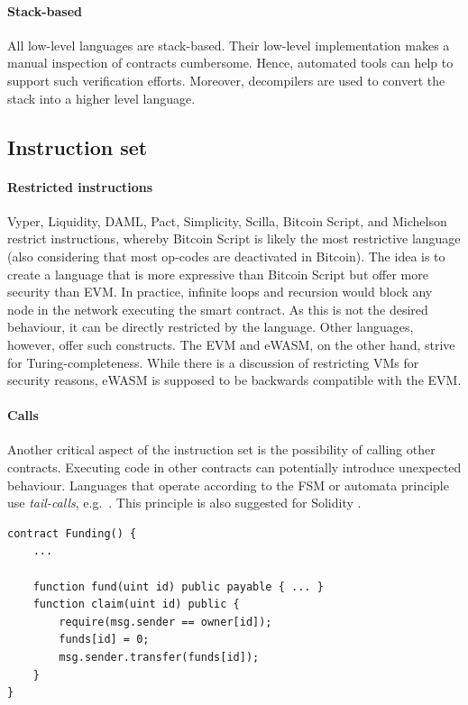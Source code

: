 \paragraph{Stack-based}
All low-level languages are stack-based. Their low-level implementation makes a manual inspection of contracts cumbersome. Hence, automated tools can help to support such verification efforts. Moreover, decompilers are used to convert the stack into a higher level language.

\subsection{Instruction set}
\paragraph{Restricted instructions}
Vyper, Liquidity, DAML, Pact, Simplicity, Scilla, Bitcoin Script, and Michelson restrict instructions, whereby Bitcoin Script is likely the most restrictive language (also considering that most op-codes are deactivated in Bitcoin). 
The idea is to create a language that is more expressive than Bitcoin Script but offer more security than EVM.
In practice, infinite loops and recursion would block any node in the network executing the smart contract. As this is not the desired behaviour, it can be directly restricted by the language. Other languages, however, offer such constructs.
The EVM and eWASM, on the other hand, strive for Turing-completeness. While there is a discussion of restricting VMs for security reasons, eWASM is supposed to be backwards compatible with the EVM.

\paragraph{Calls}
Another critical aspect of the instruction set is the possibility of calling other contracts. Executing code in other contracts can potentially introduce unexpected behaviour. Languages that operate according to the FSM or automata principle use \emph{tail-calls}, e.g.\ \cite{Sergey2018}. This principle is also suggested for Solidity \cite{ConsenSys2018Security}.

\begin{lstlisting}[caption={Tail calls implemented in Solidity.},label=lst:tail-call,language=Solidity]
contract Funding() { 
	...
	
	function fund(uint id) public payable { ... }
	function claim(uint id) public {
		require(msg.sender == owner[id]);
		funds[id] = 0;
		msg.sender.transfer(funds[id]);
	}
}
\end{lstlisting}


